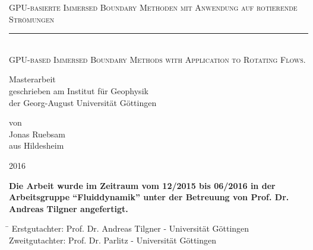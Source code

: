 \documentclass[11pt,a4paper,headsepline,bibliography=totoc,idxtotoc,DIV12,openright,twoside=true,chapterprefix=on]{scrbook}
\begin{document}
\makeatletter
\renewcommand*\env@cases[1][1.2]{%
  \let\@ifnextchar\new@ifnextchar
  \left\lbrace
  \def\arraystretch{#1}%
  \array{@{}l@{\quad}l@{}}%
}
\makeatother

\begin{titlepage}
       \begin{center}
       \begin{huge}
       \textsc{GPU-basierte Immersed Boundary Methoden mit Anwendung auf rotierende Strömungen}
       \rule{0.9\textwidth}{0.4pt}\\
       \textsc{GPU-based Immersed Boundary Methods with Application to Rotating Flows.}\\[1.8cm]
       \end{huge}
       \begin{large}
	Masterarbeit\\[2cm]
	geschrieben am Institut für Geophysik\\
	der Georg-August Universität Göttingen\\[2cm]
       \end{large}
       \begin{large}
       von\\[.5cm]
       Jonas Ruebsam\\
       aus Hildesheim\\
       \vfill
       \begin{center}
       2016
       \end{center}
       \end{large}
     \end{center}
\end{titlepage}

\mbox{}
\thispagestyle{empty}
\newpage
\newpage
{}
\thispagestyle{empty}
\vfill
\noindent \textbf{Die Arbeit wurde im Zeitraum vom 12/2015 bis 06/2016 in der Arbeitsgruppe "`Fluiddynamik"'
 unter der Betreuung von Prof. Dr. Andreas Tilgner angefertigt. }\\

\vfill
\begin{tabbing}
  \hspace{3cm}\=\kill
   Erstgutachter: \quad  Prof. Dr. Andreas Tilgner - Universität Göttingen\\
   Zweitgutachter: \quad  Prof. Dr. Parlitz - Universität Göttingen\\
\end{tabbing}
\end{document}
